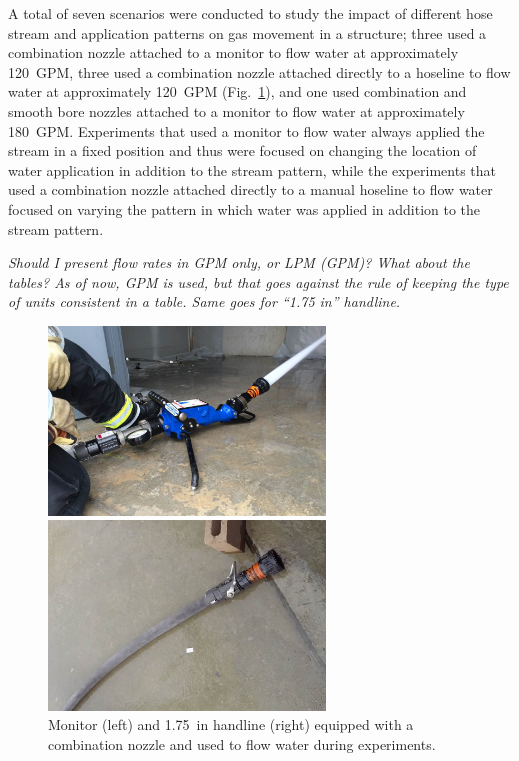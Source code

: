 \documentclass[12pt,oneside]{book}
\begin{document}
A total of seven scenarios were conducted to study the impact of different hose stream and application patterns on gas movement in a structure; three used a combination nozzle attached to a monitor to flow water at approximately 120~GPM, three used a combination nozzle attached directly to a hoseline to flow water at approximately 120~GPM (Fig.~\ref{fig:monitor+handline}), and one used combination and smooth bore nozzles attached to a monitor to flow water at approximately 180~GPM. Experiments that used a monitor to flow water always applied the stream in a fixed position and thus were focused on changing the location of water application in addition to the stream pattern, while the experiments that used a combination nozzle attached directly to a manual hoseline  to flow water focused on varying the pattern in which water was applied in addition to the stream pattern.

\textit{Should I present flow rates in GPM only, or LPM (GPM)? What about the tables? As of now, GPM is used, but that goes against the rule of keeping the type of units consistent in a table. Same goes for ``1.75 in'' handline.}
\begin{figure}[!ht]
	\minipage{3in}
	\begin{center}
		\includegraphics[width=2.9in]{../Figures/Pictures/monitor}
	\end{center} 
	\endminipage \hfill
	\minipage{3in}
	\begin{center}
		\includegraphics[width=2.9in]{../Figures/Pictures/handline}
	\end{center}
	\endminipage \hfill
	\caption[Monitor and handline equipped with a combination nozzle.]{Monitor (left) and 1.75~in handline (right) equipped with a combination nozzle and used to flow water during experiments.}
	\label{fig:monitor+handline}
\end{figure}
\FloatBarrier
\end{document}
